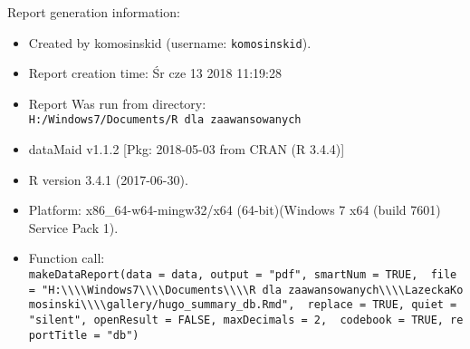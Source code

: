 \documentclass[]{article}
\newcommand{\fullline}{\noindent\makebox[\linewidth]{\rule{\textwidth}{0.4pt}}}
\begin{document}
\fullline

Report generation information:

\begin{itemize}
\item
  Created by komosinskid (username: \texttt{komosinskid}).
\item
  Report creation time: Śr cze 13 2018 11:19:28
\item
  Report Was run from directory:
  \texttt{H:/Windows7/Documents/R\ dla\ zaawansowanych}
\item
  dataMaid v1.1.2 {[}Pkg: 2018-05-03 from CRAN (R 3.4.4){]}
\item
  R version 3.4.1 (2017-06-30).
\item
  Platform: x86\_64-w64-mingw32/x64 (64-bit)(Windows 7 x64 (build 7601)
  Service Pack 1).
\item
  Function call:
  \texttt{makeDataReport(data\ =\ data,\ output\ =\ "pdf",\ smartNum\ =\ TRUE,\ \ file\ =\ "H:\textbackslash{}\textbackslash{}\textbackslash{}\textbackslash{}Windows7\textbackslash{}\textbackslash{}\textbackslash{}\textbackslash{}Documents\textbackslash{}\textbackslash{}\textbackslash{}\textbackslash{}R\ dla\ zaawansowanych\textbackslash{}\textbackslash{}\textbackslash{}\textbackslash{}LazeckaKomosinski\textbackslash{}\textbackslash{}\textbackslash{}\textbackslash{}gallery/hugo\_summary\_db.Rmd",\ \ replace\ =\ TRUE,\ quiet\ =\ "silent",\ openResult\ =\ FALSE,\ maxDecimals\ =\ 2,\ \ codebook\ =\ TRUE,\ reportTitle\ =\ "db")}
\end{itemize}
\end{document}
